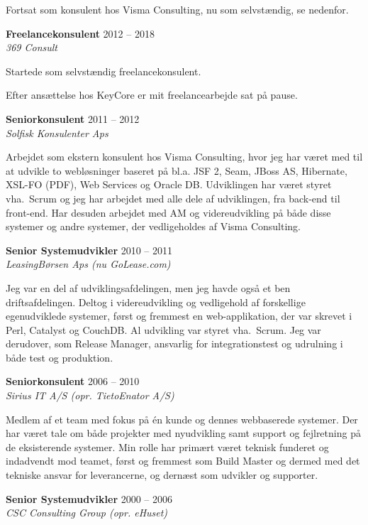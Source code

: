 \documentclass[a4paper,11pt]{article}
\begin{document}
Fortsat som konsulent hos Visma Consulting, nu som selvstændig, se
nedenfor.

\smallskip

\textbf{Freelancekonsulent} \hfill 2012 -- 2018 \\
\textsl{369 Consult}

Startede som selvstændig freelancekonsulent.

Efter ansættelse hos KeyCore er mit freelancearbejde sat på pause.

\smallskip

\textbf{Seniorkonsulent} \hfill 2011 -- 2012 \\
\textsl{Solfisk Konsulenter Aps}

Arbejdet som ekstern konsulent hos Visma Consulting, hvor jeg har
været med til at udvikle to webløsninger baseret på bl.a. JSF 2, Seam,
JBoss AS, Hibernate, XSL-FO (PDF), Web Services og Oracle
DB. Udviklingen har været styret vha.\ Scrum og jeg har arbejdet med
alle dele af udviklingen, fra back-end til front-end.  Har desuden
arbejdet med AM og videreudvikling på både disse systemer og andre
systemer, der vedligeholdes af Visma Consulting.

\smallskip

\textbf{Senior Systemudvikler} \hfill 2010 -- 2011 \\
\textsl{LeasingBørsen Aps (nu GoLease.com)}

Jeg var en del af udviklingsafdelingen, men jeg havde også et ben
driftsafdelingen. Deltog i videreudvikling og vedligehold af
forskellige egenudviklede systemer, først og fremmest en
web-applikation, der var skrevet i Perl, Catalyst og CouchDB.  Al
udvikling var styret vha.\ Scrum. Jeg var derudover, som Release
Manager, ansvarlig for integrationstest og udrulning i både test og
produktion.

\smallskip

\textbf{Seniorkonsulent} \hfill 2006 -- 2010 \\
\textsl{Sirius IT A/S (opr. TietoEnator A/S)}

Medlem af et team med fokus på én kunde og dennes webbaserede
systemer. Der har været tale om både projekter med nyudvikling samt
support og fejlretning på de eksisterende systemer. Min rolle har
primært været teknisk funderet og indadvendt mod teamet, først og
fremmest som Build Master og dermed med det tekniske ansvar for
leverancerne, og dernæst som udvikler og supporter.

\smallskip

\textbf{Senior Systemudvikler} \hfill 2000 -- 2006 \\
\textsl{CSC Consulting Group (opr. eHuset)}
\end{document}

